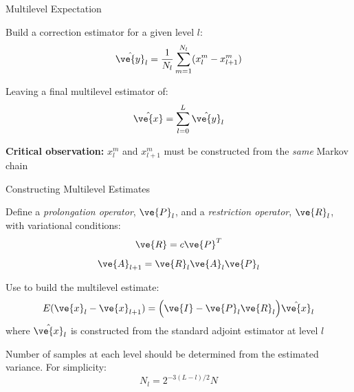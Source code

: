 \documentclass{beamer}
\begin{document}
\begin{frame}{Multilevel Expectation}

  Build a correction estimator for a given level $l$:
  \[
  \hat{\ve{y}}_{l} = \frac{1}{N_l} \sum_{m=1}^{N_l} (x^m_{l} -
  x^m_{l+1})
  \]

  \medskip

  Leaving a final multilevel estimator of:
  \[
  \hat{\ve{x}} = \sum_{l=0}^L \hat{\ve{y}}_{l}
  \]

  \medskip

  \textbf{Critical observation:} $x^m_{l}$ and $x^m_{l+1}$
  must be constructed from the \textit{same} Markov chain

\end{frame}

\begin{frame}{Constructing Multilevel Estimates}

  Define a \textit{prolongation operator}, $\ve{P}_l$, and a
  \textit{restriction operator}, $\ve{R}_l$, with variational conditions:
  \[
  \ve{R} = c \ve{P}^T
  \]
  \[
  \ve{A}_{l+1} = \ve{R}_l\ve{A}_l\ve{P}_l
  \]

  Use to build the multilevel estimate:
  \[
  E(\ve{x}_{l} - \ve{x}_{l+1}) = \Big(\ve{I} - \ve{P}_l \ve{R}_l\Big)
  \hat{\ve{x}}_{l}
  \]
  where $\hat{\ve{x}}_{l}$ is constructed from the standard adjoint
  estimator at level $l$

  \medskip
  
  Number of samples at each level should be determined from the
  estimated variance. For simplicity:
  \[
  N_l = 2^{-3(L-l)/2}N
  \]

\end{frame}
\end{document}
